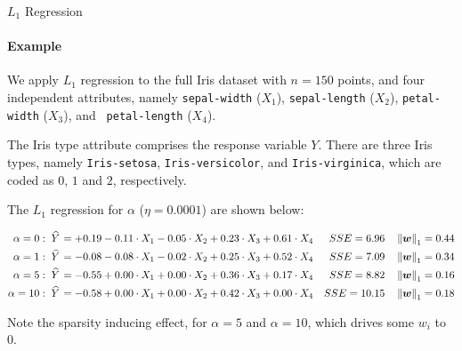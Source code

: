 	\begin{frame}[fragile]{$L_1$ Regression}
\framesubtitle{Example}
    We apply $L_1$ regression to the full Iris dataset with $n=150$
    points, and four independent attributes, namely {\tt sepal-width}
    ($X_1$),
    {\tt sepal-length} ($X_2$), {\tt petal-width} ($X_3$), and {\tt
    petal-length} ($X_4$). 

	\medskip

The Iris type attribute comprises the response variable $Y$. 
    There are three
    Iris types, namely {\tt Iris-setosa}, {\tt Iris-versicolor}, and
    {\tt Iris-virginica}, which are coded as $0$, $1$ and $2$,
    respectively.

\medskip

    The $L_1$ regression for $\alpha$
    ($\eta=0.0001$) are
    shown below:
\begin{footnotesize}
    \begin{align*}
        \alpha = 0:\; \mkern 1.5mu\widehat{\mkern-1.5muY}\mkern 1.5mu & = +0.19 -0.11 \cdot X_1 -0.05 \cdot X_2 + 
	    0.23 \cdot X_3 + 0.61 \cdot X_4 & SSE=6.96 & \quad  \left\lVert{\boldsymbol w}\right\rVert_1=0.44\\
        \alpha = 1:\; \mkern 1.5mu\widehat{\mkern-1.5muY}\mkern 1.5mu & = -0.08 -0.08 \cdot X_1 -0.02 \cdot X_2 + 
	    0.25 \cdot X_3 + 0.52 \cdot X_4 & SSE=7.09 & \quad  \left\lVert{\boldsymbol w}\right\rVert_1=0.34\\
            \alpha = 5:\; \mkern 1.5mu\widehat{\mkern-1.5muY}\mkern 1.5mu & = -0.55 + 0.00 \cdot X_1  + 0.00 \cdot X_2 + 
	    0.36 \cdot X_3 + 0.17 \cdot X_4 & SSE=8.82 & \quad  \left\lVert{\boldsymbol w}\right\rVert_1=0.16\\
            \alpha = 10:\; \mkern 1.5mu\widehat{\mkern-1.5muY}\mkern 1.5mu & = -0.58 + 0.00 \cdot X_1  + 0.00 \cdot X_2 + 
	    0.42 \cdot X_3 + 0.00 \cdot X_4 & SSE=10.15 & \quad  \left\lVert{\boldsymbol w}\right\rVert_1=0.18
    \end{align*}
\end{footnotesize}
Note the sparsity inducing effect, 
for $\alpha=5$ and $\alpha=10$, which drives some $w_i$
to 0. 
\end{frame}

